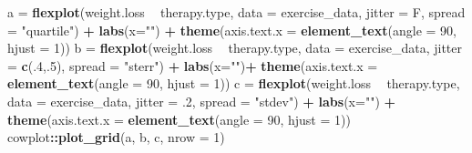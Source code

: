 \documentclass[
  doc]{apa6}
\newenvironment{Shaded}{\begin{snugshade}}{\end{snugshade}}
\newcommand{\DataTypeTok}[1]{\textcolor[rgb]{0.13,0.29,0.53}{#1}}
\newcommand{\DecValTok}[1]{\textcolor[rgb]{0.00,0.00,0.81}{#1}}
\newcommand{\FloatTok}[1]{\textcolor[rgb]{0.00,0.00,0.81}{#1}}
\newcommand{\KeywordTok}[1]{\textcolor[rgb]{0.13,0.29,0.53}{\textbf{#1}}}
\newcommand{\NormalTok}[1]{#1}
\newcommand{\OperatorTok}[1]{\textcolor[rgb]{0.81,0.36,0.00}{\textbf{#1}}}
\newcommand{\StringTok}[1]{\textcolor[rgb]{0.31,0.60,0.02}{#1}}
\begin{document}
\begin{Shaded}
\begin{Highlighting}[]
\NormalTok{a =}\StringTok{ }\KeywordTok{flexplot}\NormalTok{(weight.loss }\OperatorTok{~}\StringTok{ }\NormalTok{therapy.type, }\DataTypeTok{data =}\NormalTok{ exercise_data, }
              \DataTypeTok{jitter =}\NormalTok{ F, }\DataTypeTok{spread =} \StringTok{"quartile"}\NormalTok{) }\OperatorTok{+}
\StringTok{              }\KeywordTok{labs}\NormalTok{(}\DataTypeTok{x=}\StringTok{""}\NormalTok{) }\OperatorTok{+}\StringTok{ }
\StringTok{              }\KeywordTok{theme}\NormalTok{(}\DataTypeTok{axis.text.x =} \KeywordTok{element_text}\NormalTok{(}\DataTypeTok{angle =} \DecValTok{90}\NormalTok{, }\DataTypeTok{hjust =} \DecValTok{1}\NormalTok{))}
\NormalTok{b =}\StringTok{ }\KeywordTok{flexplot}\NormalTok{(weight.loss }\OperatorTok{~}\StringTok{ }\NormalTok{therapy.type, }\DataTypeTok{data =}\NormalTok{ exercise_data, }
              \DataTypeTok{jitter =} \KeywordTok{c}\NormalTok{(.}\DecValTok{4}\NormalTok{,.}\DecValTok{5}\NormalTok{), }\DataTypeTok{spread =} \StringTok{"sterr"}\NormalTok{) }\OperatorTok{+}
\StringTok{              }\KeywordTok{labs}\NormalTok{(}\DataTypeTok{x=}\StringTok{""}\NormalTok{)}\OperatorTok{+}
\StringTok{              }\KeywordTok{theme}\NormalTok{(}\DataTypeTok{axis.text.x =} \KeywordTok{element_text}\NormalTok{(}\DataTypeTok{angle =} \DecValTok{90}\NormalTok{, }\DataTypeTok{hjust =} \DecValTok{1}\NormalTok{))  }
\NormalTok{c =}\StringTok{ }\KeywordTok{flexplot}\NormalTok{(weight.loss }\OperatorTok{~}\StringTok{ }\NormalTok{therapy.type, }\DataTypeTok{data =}\NormalTok{ exercise_data, }
              \DataTypeTok{jitter =} \FloatTok{.2}\NormalTok{, }\DataTypeTok{spread =} \StringTok{"stdev"}\NormalTok{) }\OperatorTok{+}\StringTok{ }
\StringTok{              }\KeywordTok{labs}\NormalTok{(}\DataTypeTok{x=}\StringTok{""}\NormalTok{) }\OperatorTok{+}\StringTok{ }
\StringTok{              }\KeywordTok{theme}\NormalTok{(}\DataTypeTok{axis.text.x =} \KeywordTok{element_text}\NormalTok{(}\DataTypeTok{angle =} \DecValTok{90}\NormalTok{, }\DataTypeTok{hjust =} \DecValTok{1}\NormalTok{))    }
\NormalTok{cowplot}\OperatorTok{::}\KeywordTok{plot_grid}\NormalTok{(a, b, c, }\DataTypeTok{nrow =} \DecValTok{1}\NormalTok{)}
\end{Highlighting}
\end{Shaded}
\end{document}
